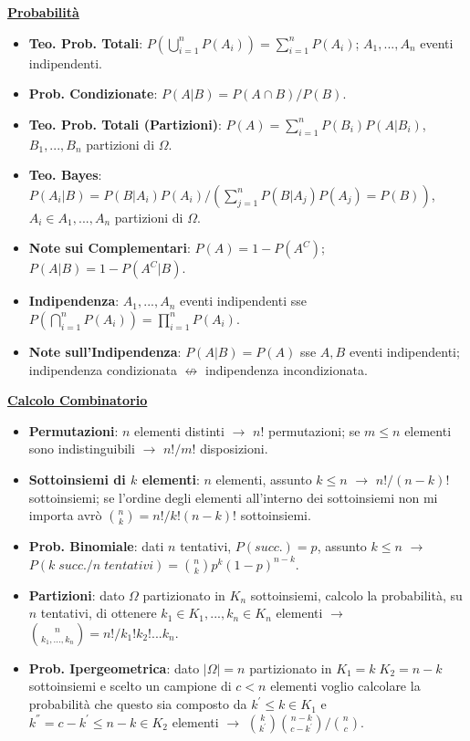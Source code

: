 \documentclass[8pt]{extarticle}
\begin{document}
\thispagestyle{empty}
\begin{multicols*}{3}

    \textbf{\underline{Probabilità}}
    \begin{itemize}
        \item \textbf{Teo. Prob. Totali}: $P(\bigcup_{i=1}^{n}P(A_{i}))=\sum_{i=1}^{n}P(A_{i})$; $A_{1},...,A_{n}$ eventi indipendenti.
        \item \textbf{Prob. Condizionate}: $P(A|B)={P(A\cap B)}/{P(B)}$.
        \item \textbf{Teo. Prob. Totali (Partizioni)}: $P(A)=\sum_{i=1}^{n}P(B_{i})P(A|B_{i})$, $B_{1},...,B_{n}$ partizioni di $\Omega$.
        \item \textbf{Teo. Bayes}: $P(A_{i}|B)=P(B|A_{i})P(A_{i})/(\sum_{j=1}^{n}P(B|A_{j})P(A_j)=P(B))$, $A_{i}\in A_{1},...,A_{n}$ partizioni di $\Omega$.
        \item \textbf{Note sui Complementari}: $P(A)=1-P(A^{C})$; $P(A|B)=1-P(A^{C}|B)$.
        \item \textbf{Indipendenza}: $A_{1},...,A_{n}$ eventi indipendenti sse $P(\bigcap_{i=1}^{n}P(A_{i}))=\prod_{i=1}^{n}P(A_{i})$.
        \item \textbf{Note sull'Indipendenza}: $P(A|B)=P(A)$ sse $A, B$ eventi indipendenti; indipendenza condizionata $\nleftrightarrow$ indipendenza incondizionata.
    \end{itemize}

    \textbf{\underline{Calcolo Combinatorio}}
    \begin{itemize}
        \item \textbf{Permutazioni}: $n$ elementi distinti $\rightarrow$ $n!$ permutazioni; se $m\leq n$ elementi sono indistinguibili $\rightarrow$ ${n!}/{m!}$ disposizioni.
        \item \textbf{Sottoinsiemi di $k$ elementi}: $n$ elementi, assunto $k\leq n$ $\rightarrow$ ${n!}/{(n-k)!}$ sottoinsiemi; se l'ordine degli elementi all'interno dei sottoinsiemi non mi importa avrò $\binom{n}{k}={n!}/{k!(n-k)!}$ sottoinsiemi.
        \item \textbf{Prob. Binomiale}: dati $n$ tentativi, $P(succ.)=p$, assunto $k\leq n$ $\rightarrow$ $P({k\; succ.}/{n\; tentativi})=\binom{n}{k}p^{k}(1-p)^{n-k}$.
        \item \textbf{Partizioni}: dato $\Omega$ partizionato in $K_{n}$ sottoinsiemi, calcolo la probabilità, su $n$ tentativi, di ottenere $k_{1}\in K_{1},...,k_{n}\in K_{n}$ elementi $\rightarrow$ $\binom{n}{k_{1},...,k_{n}}={n!}/{k_{1}!k_{2}!...k_{n}}$.
        \item \textbf{Prob. Ipergeometrica}: dato $|\Omega|=n$ partizionato in $K_{1}=k\; K_{2}=n-k$ sottoinsiemi e scelto un campione di $c<n$ elementi voglio calcolare la probabilità che questo sia composto da $k^{'}\leq k\in K_{1}$ e $k^{''} = c-k^{'}\leq n-k\in K_{2}$ elementi $\rightarrow$ ${\binom{k}{k^{'}}\binom{n-k}{c-k^{'}}}/{\binom{n}{c}}$.
    \end{itemize}


\end{multicols*}
\end{document}
